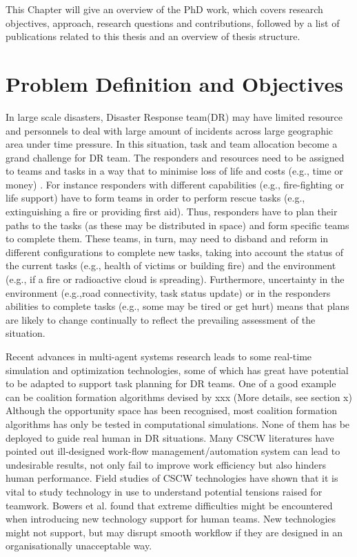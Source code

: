 This Chapter will give an overview of the PhD work, which covers research objectives, approach, research questions and contributions, followed by a list of publications related to this thesis and an overview of thesis structure.\\


\section{Problem Definition and Objectives}
In large scale disasters, Disaster Response team(DR) may have limited resource and personnels to deal with large amount of incidents across large geographic area under time pressure. In this situation, task and team allocation become a grand challenge for DR team. The responders and resources need to be assigned to teams and tasks in a way that to minimise loss of life and costs (e.g., time or money) . For instance responders with different capabilities (e.g., fire-fighting or life support) have to form teams in order to perform rescue tasks (e.g., extinguishing a fire or providing first aid). Thus, responders have to plan their paths to the tasks (as these may be distributed in space) and form specific teams to complete them. These teams, in turn, may need to disband and reform in different configurations to complete new tasks, taking into account the status of the current tasks (e.g., health of victims or building fire) and the environment (e.g., if a fire or radioactive cloud is spreading). Furthermore, uncertainty in the environment (e.g.,road connectivity, task status update) or in the responders abilities to complete tasks (e.g., some may be tired or get hurt) means that plans are likely to change continually to reflect the prevailing assessment of the situation.

Recent advances in multi-agent systems research leads to some real-time simulation and optimization technologies, some of which has great have potential to be adapted to support task planning for DR teams. One of a good example can be coalition formation algorithms devised by xxx (More details, see section x) Although the opportunity space has been recognised, most coalition formation algorithms has only be tested in computational simulations. None of them has be deployed to guide real human in DR situations. Many CSCW literatures have pointed out ill-designed work-flow management/automation system can lead to undesirable results, not only fail to improve work efficiency but also hinders human performance. Field studies of CSCW technologies have shown that it is vital to study technology in use to understand potential tensions raised for teamwork. Bowers et al. found that extreme difficulties might be encountered when introducing new technology support for human teams. New technologies might not support, but may disrupt smooth workflow if they are designed in an organisationally unacceptable way. \\

